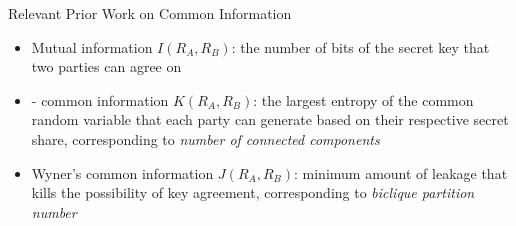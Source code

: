 \begin{frame}{Relevant Prior Work on Common Information}
	\begin{itemize}
		\item Mutual information $ I(R_A, R_B) $: the number of bits of the secret key that two parties can agree on
		\item \gacs-\korner \cite{} common information  $ K(R_A, R_B) $: the largest entropy of the common random variable that each party can generate based on their respective secret share, corresponding to \textit{number of connected components}
		\item Wyner's common information \cite{} $ J(R_A, R_B) $: minimum amount of leakage that kills the possibility of key agreement, corresponding to \textit{biclique partition number}
	\end{itemize}
	
\end{frame}
